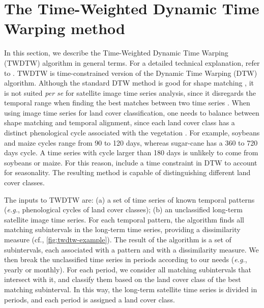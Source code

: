 \documentclass[article,shortnames]{jss}
\begin{document}
\hypertarget{the-time-weighted-dynamic-time-warping-method}{%
\section{The Time-Weighted Dynamic Time Warping
method}\label{the-time-weighted-dynamic-time-warping-method}}

In this section, we describe the Time-Weighted Dynamic Time Warping
(TWDTW) algorithm in general terms. For a detailed technical
explanation, refer to \citet{Maus:2016}. TWDTW is time-constrained
version of the Dynamic Time Warping (DTW) algorithm. Although the
standard DTW method is good for shape matching \citep{Keogh:2005}, it is
not suited \emph{per se} for satellite image time series analysis, since
it disregards the temporal range when finding the best matches between
two time series \citep{Maus:2016}. When using image time series for land
cover classification, one needs to balance between shape matching and
temporal alignment, since each land cover class has a distinct
phenological cycle associated with the vegetation
\citep[\citet{Zhang:2003}]{Reed:1994}. For example, soybeans and maize
cycles range from 90 to 120 days, whereas sugar-cane has a 360 to 720
days cycle. A time series with cycle larger than 180 days is unlikely to
come from soybeans or maize. For this reason, \citet{Maus:2016} include
a time constraint in DTW to account for seasonality. The resulting
method is capable of distinguishing different land cover classes.

The inputs to TWDTW are: (a) a set of time series of known temporal
patterns (\emph{e.g.}, phenological cycles of land cover classes); (b)
an unclassified long-term satellite image time series. For each temporal
pattern, the algorithm finds all matching subintervals in the long-term
time series, providing a dissimilarity measure (cf.,
\autoref{fig:twdtw-example}). The result of the algorithm is a set of
subintervals, each associated with a pattern and with a dissimilarity
measure. We then break the unclassified time series in periods according
to our needs (\emph{e.g.}, yearly or monthly). For each period, we
consider all matching subintervals that intersect with it, and classify
them based on the land cover class of the best matching subinterval. In
this way, the long-term satellite time series is divided in periods, and
each period is assigned a land cover class.
\end{document}
